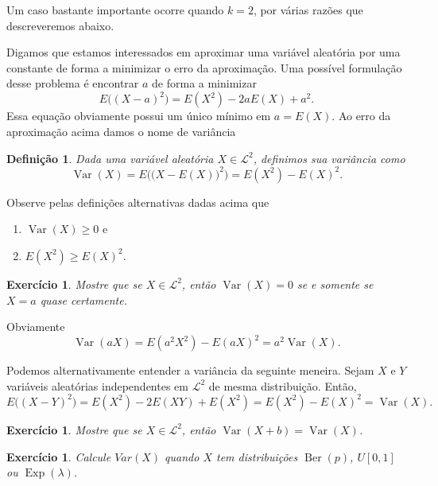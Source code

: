\documentclass[reqno, final]{book}
\newcommand*\1{\mathds{1}}
\newtheorem{definition}[theorem]{Definição}
\newtheorem{exercise}[example]{Exercício}
\DeclareMathOperator{\Var}{Var}
\DeclareMathOperator{\Ber}{Ber}
\DeclareMathOperator{\Exp}{Exp}
\begin{document}
Um caso bastante importante ocorre quando $k = 2$, por várias razões que descreveremos abaixo.

Digamos que estamos interessados em aproximar uma variável aleatória por uma constante de forma a minimizar o erro da aproximação.
Uma possível formulação desse problema é encontrar $a$ de forma a minimizar
\begin{equation}
  E\Big( (X - a)^2 \Big) = E(X^2) - 2 a E(X) + a^2.
\end{equation}
Essa equação obviamente possui um único mínimo em $a = E(X)$.
Ao erro da aproximação acima damos o nome de variância

\begin{definition}
  Dada uma variável aleatória $X \in \mathcal{L}^2$, definimos sua variância  como
  \begin{equation}
    \Var(X) = E \Big( \big(X - E(X)\big)^2 \Big) = E(X^2) - E(X)^2.
  \end{equation}
\end{definition}

Observe pelas definições alternativas dadas acima que
\begin{enumerate}[\quad a)]
\item $\Var(X) \geq 0$ e
\item $E(X^2) \geq E(X)^2$.
\end{enumerate}

\begin{exercise}
  Mostre que se $X \in \mathcal{L}^2$, então $\Var(X) = 0$ se e somente se $X = a$ quase certamente.
\end{exercise}

Obviamente
\begin{equation}
  \Var(a X) = E(a^2 X^2) - E(aX)^2 = a^2 \Var(X).
\end{equation}

Podemos alternativamente entender a variância da seguinte meneira.
Sejam $X$ e $Y$ variáveis aleatórias independentes em $\mathcal{L}^2$ de mesma distribuição.
Então,
\begin{equation}
  E\big( (X - Y)^2 \big) = E(X^2) - 2 E(XY) + E(X^2) = E(X^2) - E(X)^2 = \Var(X).
\end{equation}

\begin{exercise}
  Mostre que se $X \in \mathcal{L}^2$, então $\Var(X + b) = \Var(X)$.
\end{exercise}

\begin{exercise}
  Calcule $Var(X)$ quando $X$ tem distribuições $\Ber(p)$, $U[0,1]$ ou $\Exp(\lambda)$.
\end{exercise}
\end{document}
